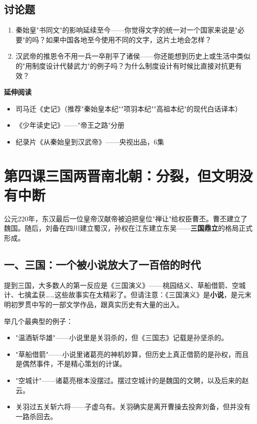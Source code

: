 \documentclass[a4paper,12pt]{ctexart}
\begin{document}
\subsection*{讨论题}
\begin{enumerate}
  \item 秦始皇"书同文"的影响延续至今——你觉得文字的统一对一个国家来说是"必要"的吗？如果中国各地至今使用不同的文字，这片土地会怎样？
  \item 汉武帝的推恩令不用一兵一卒削平了诸侯——你还能想到历史上或生活中类似的"用制度设计代替武力"的例子吗？为什么制度设计有时候比直接对抗更有效？
\end{enumerate}

\vspace{0.3cm}
\textcolor{blue!70!black}{\textbf{延伸阅读}}
\begin{itemize}
  \item 司马迁《史记》（推荐"秦始皇本纪""项羽本纪""高祖本纪"的现代白话译本）
  \item 《少年读史记》——"帝王之路"分册
  \item 纪录片《从秦始皇到汉武帝》——央视出品，6集
\end{itemize}

\newpage

\section{\textcolor{orange!80!black}{第四课\quad 三国两晋南北朝：分裂，但文明没有中断}}

公元220年，东汉最后一位皇帝汉献帝被迫把皇位"禅让"给权臣曹丕。曹丕建立了魏国。随后，刘备在四川建立蜀汉，孙权在江东建立东吴——\textbf{三国鼎立}的格局正式形成。

\subsection*{一、三国：一个被小说放大了一百倍的时代}

提到三国，大多数人的第一反应是《三国演义》——桃园结义、草船借箭、空城计、七擒孟获……这些故事实在太精彩了。但请注意：《三国演义》是\textbf{小说}，是元末明初罗贯中写的一部文学作品，跟真实历史有大量的出入。

举几个最典型的例子：
\begin{itemize}
  \item "温酒斩华雄"——小说里是关羽杀的，但《三国志》记载是孙坚杀的。
  \item "草船借箭"——小说里诸葛亮的神机妙算，但历史上真正借箭的是孙权，而且是偶然事件，不是精心策划的计谋。
  \item "空城计"——诸葛亮根本没摆过。摆过空城计的是魏国的文聘，以及后来的赵云。
  \item 关羽过五关斩六将——子虚乌有。关羽确实是离开曹操去投奔刘备，但并没有一路杀回去。
\end{itemize}
\end{document}
